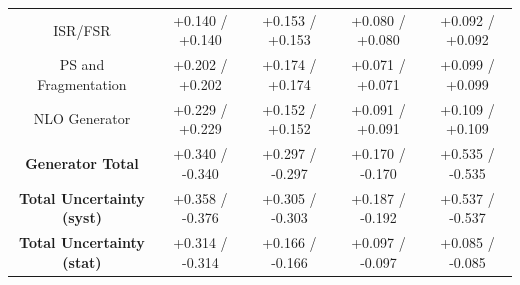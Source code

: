 \begin{table}[htbp]
\begin{center}
\begin{tabular}{|c|c|c|c|c|}
   ISR/FSR                               &  +0.140   / +0.140   & +0.153   / +0.153   & +0.080   / +0.080   & +0.092   / +0.092   \\
   PS and Fragmentation                  &  +0.202   / +0.202   & +0.174   / +0.174   & +0.071   / +0.071   & +0.099   / +0.099   \\
   NLO Generator                         &  +0.229   / +0.229   & +0.152   / +0.152   & +0.091   / +0.091   & +0.109   / +0.109   \\
   \hline
   \textbf{Generator Total}              &  +0.340   / -0.340   & +0.297   / -0.297   & +0.170   / -0.170   & +0.535   / -0.535   \\
   \hline
   \hline
   \textbf{Total Uncertainty (syst)}     &  +0.358   / -0.376   & +0.305   / -0.303   & +0.187   / -0.192   & +0.537   / -0.537   \\
   \textbf{Total Uncertainty (stat)}     &  +0.314   / -0.314   & +0.166   / -0.166   & +0.097   / -0.097   & +0.085   / -0.085   \\
   \hline
   \end{tabular}
 
   \end{center}
 \end{table}

